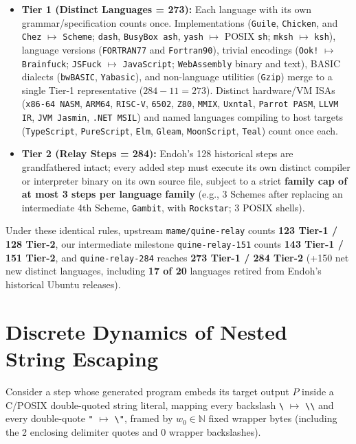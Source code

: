\documentclass[10pt,twocolumn]{article}
\theoremstyle{definition}
\begin{document}
\begin{itemize}
  \item \textbf{Tier 1 (Distinct Languages = 273):} Each language with its own grammar/specification counts once. Implementations (\texttt{Guile}, \texttt{Chicken}, and \texttt{Chez} $\mapsto$ \texttt{Scheme}; \texttt{dash}, \texttt{BusyBox ash}, \texttt{yash} $\mapsto$ POSIX \texttt{sh}; \texttt{mksh} $\mapsto$ \texttt{ksh}), language versions (\texttt{FORTRAN77} and \texttt{Fortran90}), trivial encodings (\texttt{Ook!} $\mapsto$ \texttt{Brainfuck}; \texttt{JSFuck} $\mapsto$ \texttt{JavaScript}; \texttt{WebAssembly} binary and text), BASIC dialects (\texttt{bwBASIC}, \texttt{Yabasic}), and non-language utilities (\texttt{Gzip}) merge to a single Tier-1 representative ($284 - 11 = 273$). Distinct hardware/VM ISAs (\texttt{x86-64 NASM}, \texttt{ARM64}, \texttt{RISC-V}, \texttt{6502}, \texttt{Z80}, \texttt{MMIX}, \texttt{Uxntal}, \texttt{Parrot PASM}, \texttt{LLVM IR}, \texttt{JVM Jasmin}, \texttt{.NET MSIL}) and named languages compiling to host targets (\texttt{TypeScript}, \texttt{PureScript}, \texttt{Elm}, \texttt{Gleam}, \texttt{MoonScript}, \texttt{Teal}) count once each.
  \item \textbf{Tier 2 (Relay Steps = 284):} Endoh's 128 historical steps are grandfathered intact; every added step must execute its own distinct compiler or interpreter binary on its own source file, subject to a strict \textbf{family cap of at most 3 steps per language family} (e.g., 3 Schemes after replacing an intermediate 4th Scheme, \texttt{Gambit}, with \texttt{Rockstar}; 3 POSIX shells).
\end{itemize}

Under these identical rules, upstream \texttt{mame/quine-relay} counts \textbf{123 Tier-1 / 128 Tier-2}, our intermediate milestone \texttt{quine-relay-151} counts \textbf{143 Tier-1 / 151 Tier-2}, and \texttt{quine-relay-284} reaches \textbf{273 Tier-1 / 284 Tier-2} (+150 net new distinct languages, including \textbf{17 of 20} languages retired from Endoh's historical Ubuntu releases).

\section{Discrete Dynamics of Nested String Escaping}
\label{sec:dynamics}

Consider a step whose generated program embeds its target output $P$ inside a C/POSIX double-quoted string literal, mapping every backslash \texttt{\textbackslash} $\mapsto$ \texttt{\textbackslash\textbackslash} and every double-quote \texttt{"} $\mapsto$ \texttt{\textbackslash"}, framed by $w_0 \in \mathbb{N}$ fixed wrapper bytes (including the 2 enclosing delimiter quotes and 0 wrapper backslashes).
\end{document}
